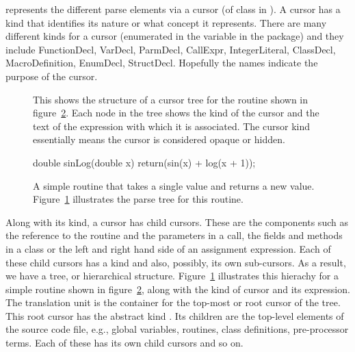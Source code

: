 \libclang{} represents the different parse elements 
via a cursor (of
class  in \R).  A cursor has a kind that identifies
its nature or what concept it represents. There are many different
kinds for a cursor (enumerated in the variable  in
the  package) and they include FunctionDecl, VarDecl,
ParmDecl, CallExpr, IntegerLiteral, ClassDecl, MacroDefinition,
EnumDecl, StructDecl.  Hopefully the names indicate the purpose of the
cursor.

\begin{figure}
  
\cprotect\caption{This shows the structure of a cursor tree for the 
\C{} routine  shown in figure~\ref{fig:sinLogRoutine}.
Each node in the tree shows the kind of the cursor
and the text of the expression with which it is associated.
The cursor kind  essentially means the cursor is considered
opaque or hidden.
}
\label{fig:sinLogTree}  
\end{figure}

\begin{figure}
\centering
\begin{CCode}
              double
              sinLog(double x)
              {
                 return(sin(x) + log(x + 1));
              }
\end{CCode}  

\caption{A simple routine that takes a single  value
and returns a new value. Figure~\ref{fig:sinLogTree} illustrates the
parse tree for this routine.}\label{fig:sinLogRoutine}
\end{figure}


Along with its kind, a cursor has child cursors.  These are the
components such as the reference to the routine and the parameters in
a call, the fields and methods in a \Cpp{} class or the left and right
hand side of an assignment expression. Each of these child cursors has
a kind and also, possibly, its own sub-cursors. As a result, we have a
tree, or hierarchical structure.  Figure~\ref{fig:sinLogTree}
illustrates this hierachy for a simple routine shown in
figure~\ref{fig:sinLogRoutine}, along with the kind of cursor and 
its expression.  The translation unit is the
container for the top-most or root cursor of the tree.  This root
cursor has the abstract kind .  Its
children are the top-level elements of the source code file,
e.g., global variables, routines, class definitions, pre-processor
terms. Each of these has its own child cursors and so on.

